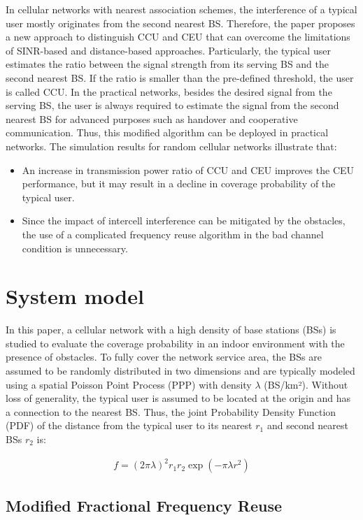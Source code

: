 \documentclass{svproc}
\begin{document}
In cellular networks with nearest association schemes, the interference of a typical user mostly originates from the second nearest BS.  Therefore,  the paper proposes a new approach to distinguish CCU and CEU that can overcome the limitations of SINR-based and distance-based approaches. Particularly, the typical user estimates the ratio between the signal strength from its serving BS and the second nearest BS. If the ratio is smaller than the pre-defined threshold, the user is called CCU. In the practical networks, besides the desired signal from the serving BS, the user is always required to estimate the signal from the second nearest BS for advanced purposes such as handover and cooperative communication. Thus, this modified algorithm can be deployed in practical networks. The simulation results for random cellular networks illustrate that:
\begin{itemize}
	\item An increase in transmission power ratio of CCU and CEU improves the CEU performance, but it may result in a decline in coverage probability of the typical user.
	\item Since the impact of intercell interference can be mitigated by the obstacles, the use of a complicated frequency reuse algorithm in the bad channel condition is unnecessary.
\end{itemize}

\section{System model}
In this paper, a cellular network with a high density of base stations (BSs) is studied to evaluate the coverage probability in an indoor environment with the presence of obstacles. To fully cover the network service area, the BSs are assumed to be randomly distributed in two dimensions and are typically modeled using a spatial Poisson Point Process (PPP) with density $\lambda$ (BS/km²). Without loss of generality, the typical user is assumed to be located at the origin and has a connection to the nearest BS. Thus, the joint Probability Density Function (PDF) of the distance from the typical user to its nearest $r_1$ and second nearest BSs $r_2$ is:

\begin{align}
	f = (2\pi\lambda)^2 r_1 r_2 \exp(-\pi\lambda r^2)
	\label{f}
\end{align}

\subsection{Modified Fractional Frequency Reuse}
\label{algorithmdis}
\end{document}
